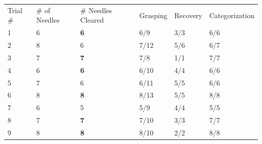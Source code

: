 \begin{table}[ht!]\footnotesize
\centering
\label{big-experiment}
\begin{tabular}{llllll}
\rowcolor[HTML]{000000} 
{\color[HTML]{FFFFFF} Trial \#} & {\color[HTML]{FFFFFF} \# of Needles} & {\color[HTML]{FFFFFF} \# Needles Cleared} & {\color[HTML]{FFFFFF} Grasping} & {\color[HTML]{FFFFFF} Recovery} & {\color[HTML]{FFFFFF} Categorization} \\
1                               & 6                                    & {\color[HTML]{32CB00} \textbf{6}}         & 6/9                             & 3/3                             & 6/6                                   \\
2                               & 8                                    & 6                                         & 7/12                            & 5/6                             & 6/7                                   \\
3                               & 7                                    & {\color[HTML]{32CB00} \textbf{7}}         & 7/8                             & 1/1                             & 7/7                                   \\
4                               & 6                                    & {\color[HTML]{32CB00} \textbf{6}}         & 6/10                            & 4/4                             & 6/6                                   \\
5                               & 7                                    & 6                                         & 6/11                            & 5/5                             & 6/6                                   \\
6                               & 8                                    & {\color[HTML]{32CB00} \textbf{8}}         & 8/13                            & 5/5                             & 8/8                                   \\
7                               & 6                                    & 5                                         & 5/9                             & 4/4                             & 5/5                                   \\
8                               & 7                                    & {\color[HTML]{32CB00} \textbf{7}}         & 7/10                            & 3/3                             & 7/7                                   \\
9                               & 8                                    & {\color[HTML]{32CB00} \textbf{8}}         & 8/10                            & 2/2                             & 8/8                                   \\

\end{tabular}
\end{table}
